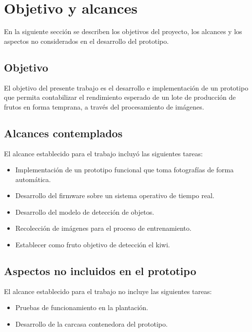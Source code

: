 
\section{Objetivo y alcances}

En la siguiente sección se describen los objetivos del proyecto, los alcances y los aspectos no considerados en el desarrollo del prototipo.

\subsection{Objetivo}

El objetivo del presente trabajo es el desarrollo e implementación de un prototipo que permita contabilizar el rendimiento esperado de un lote de producción de frutos en forma temprana, a través del procesamiento de imágenes.

\subsection{Alcances contemplados}
El alcance establecido para el trabajo incluyó las siguientes tareas:

\begin{itemize}
\item Implementación de un prototipo funcional que toma fotografías de forma automática.
\item Desarrollo del firmware sobre un sistema operativo de tiempo real.
\item Desarrollo del modelo de detección de objetos.
\item Recolección de imágenes para el proceso de entrenamiento.
\item Establecer como fruto objetivo  de detección el kiwi.
\end{itemize}

\subsection{Aspectos no incluidos en el prototipo}
\label{Aspectos_no_incluidos_en_el_prototipo}
El alcance establecido para el trabajo no incluye las siguientes tareas:

\begin{itemize}
\item Pruebas de funcionamiento en la plantación.
\item Desarrollo de la carcasa contenedora del prototipo.
\end{itemize}


